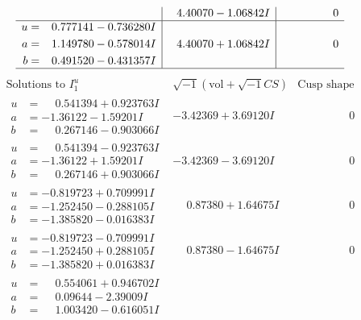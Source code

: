 \documentclass[1p]{elsarticle_modified}
\theoremstyle{definition}
\newcommand{\I}{\sqrt{-1}}
\begin{document}
$$\begin{array}{c|c|c}
 & \phantom{-}4.40070 - 1.06842 I & \phantom{-0.000000 } 0 \\ \hline\begin{aligned}
u &= \phantom{-}0.777141 - 0.736280 I \\
a &= \phantom{-}1.149780 - 0.578014 I \\
b &= \phantom{-}0.491520 - 0.431357 I\end{aligned}
 & \phantom{-}4.40070 + 1.06842 I & \phantom{-0.000000 } 0\\
 \hline 
 \end{array}$$\newpage$$\begin{array}{c|c|c}  
\text{Solutions to }I^u_{1}& \I (\text{vol} + \sqrt{-1}CS) & \text{Cusp shape}\\
 \hline 
\begin{aligned}
u &= \phantom{-}0.541394 + 0.923763 I \\
a &= -1.36122 - 1.59201 I \\
b &= \phantom{-}0.267146 - 0.903066 I\end{aligned}
 & -3.42369 + 3.69120 I & \phantom{-0.000000 } 0 \\ \hline\begin{aligned}
u &= \phantom{-}0.541394 - 0.923763 I \\
a &= -1.36122 + 1.59201 I \\
b &= \phantom{-}0.267146 + 0.903066 I\end{aligned}
 & -3.42369 - 3.69120 I & \phantom{-0.000000 } 0 \\ \hline\begin{aligned}
u &= -0.819723 + 0.709991 I \\
a &= -1.252450 - 0.288105 I \\
b &= -1.385820 - 0.016383 I\end{aligned}
 & \phantom{-}0.87380 + 1.64675 I & \phantom{-0.000000 } 0 \\ \hline\begin{aligned}
u &= -0.819723 - 0.709991 I \\
a &= -1.252450 + 0.288105 I \\
b &= -1.385820 + 0.016383 I\end{aligned}
 & \phantom{-}0.87380 - 1.64675 I & \phantom{-0.000000 } 0 \\ \hline\begin{aligned}
u &= \phantom{-}0.554061 + 0.946702 I \\
a &= \phantom{-}0.09644 - 2.39009 I \\
b &= \phantom{-}1.003420 - 0.616051 I\end{aligned}

\end{array}$$
\end{document}
